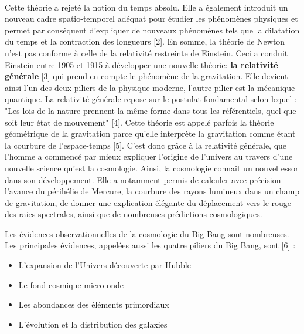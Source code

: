 \documentclass[a4paper,12pt]{report}
\theoremstyle{plain}
\theoremstyle{plain}
\begin{document}
\paragraph{}  
Cette théorie a rejeté la notion du temps absolu.
Elle a également introduit un nouveau cadre spatio-temporel adéquat pour étudier les phénomènes physiques  %
et permet par conséquent d'expliquer de nouveaux phénomènes tels que la dilatation du temps et la contraction des longueurs [2]. En somme, la théorie de Newton n'est pas conforme à celle de la relativité restreinte de Einstein. Ceci a conduit Einstein entre 1905 et 1915 à développer une nouvelle théorie: \textbf{la relativité générale} [3] qui prend en compte le phénomène de	la gravitation. Elle devient ainsi l’un des deux piliers de	la physique moderne, l’autre pilier est la mécanique quantique. La relativité
générale repose sur le postulat fondamental selon lequel : "Les lois de la nature prennent la même forme dans tous les référentiels, quel que soit leur état de mouvement" [4]. Cette théorie est appelé parfois la théorie géométrique de la gravitation parce qu’elle interprète la gravitation comme étant	la courbure de l’espace-temps [5]. 
C'est donc grâce à la relativité générale, que  l'homme a commencé par mieux expliquer l'origine de l'univers  au travers d'une nouvelle science qu'est la cosmologie. Ainsi, la cosmologie connaît  un nouvel essor dans son développement. Elle a notamment permis de calculer avec précision l'avance du périhélie de Mercure, la courbure des rayons lumineux dans un champ de gravitation, de donner une explication élégante du déplacement vers le rouge des raies spectrales, ainsi que de nombreuses prédictions cosmologiques. \newpage

Les évidences observationnelles de la cosmologie du Big Bang sont nombreuses. Les principales évidences, appelées aussi les quatre piliers du Big
Bang, sont [6] : \begin{itemize}
	\item L’expansion de l’Univers découverte par Hubble
	\item Le fond cosmique micro-onde
	\item Les abondances des éléments primordiaux
	\item L’évolution et la distribution des galaxies
	
\end{itemize}
\end{document}
